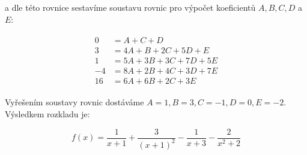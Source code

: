 a dle této rovnice sestavíme soustavu rovnic pro výpočet koeficientů $A, B, C, D$ a $E$:

\begin{gather*}
\begin{aligned}
0 &= A + C + D\\
3 &= 4A + B + 2C + 5D + E\\
1 &= 5A + 3B + 3C + 7D + 5E\\
-4 &= 8A + 2B + 4C + 3D + 7E\\
16 &= 6A + 6B + 2C + 3E
\end{aligned}
\end{gather*}

Vyřešením soustavy rovnic dostáváme $A=1, B=3, C=-1, D=0, E=-2$. \\Výsledkem rozkladu je:

\begin{displaymath}
f(x)=
\frac{1}{x+1} +
\frac{3}{(x+1)^2} -
\frac{1}{x+3} -
\frac{2}{x^2+2}
\end{displaymath}
